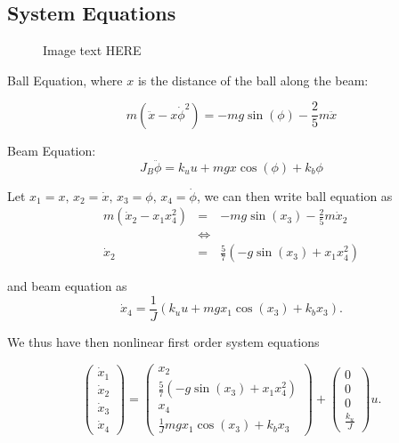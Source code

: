 \subsection{System Equations}

\begin{figure}[\textwidth]
\centering

\caption{Image text HERE}
\label{fig:throw}
\end{figure}


Ball Equation, where $x$ is the distance of the ball along the beam:

\begin{equation}
m(\ddot{x}-x\dot{\phi}^{2})=-mg\sin(\phi)-\frac{2}{5}m\ddot{x}
\end{equation}


Beam Equation:
\begin{equation}
J_{B}\ddot{\phi}=k_{u}u+mgx\cos(\phi)+k_b\phi
\end{equation}


Let $x_{1}=x,\, x_{2}=\dot{x},\, x_{3}=\phi,\, x_{4}=\dot{\phi}$,
we can then write ball equation as 
\begin{eqnarray*}
m(\dot x_{2}-x_{1}x_{4}^{2}) & = & -mg\sin(x_{3})-\frac{2}{5}m\dot{x}_{2}\\
 & \Leftrightarrow\\
\dot{x}_{2} & = & \frac{5}{7}\left(-g\sin(x_{3})+x_{1}x_{4}^{2}\right)
\end{eqnarray*}


and beam equation as
\[
\dot{x}_{4}=\frac{1}{J}\left(k_{u}u+mgx_{1}\cos(x_3)+k_bx_3\right).
\]


We thus have then nonlinear first order system equations

\[
\begin{pmatrix}\dot{x}_{1}\\
\dot{x}_{2}\\
\dot{x}_{3}\\
\dot{x}_{4}
\end{pmatrix}=\begin{pmatrix}x_{2}\\
\frac{5}{7}\left(-g\sin(x_{3})+x_{1}x_{4}^{2}\right)\\
x_{4}\\
\frac{1}{J}mgx_{1}\cos(x_3)+k_bx_3
\end{pmatrix}+\begin{pmatrix}0\\
0\\
0\\
\frac{k_{u}}{J}
\end{pmatrix}u.
\]

